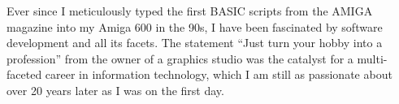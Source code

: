 \documentclass[10pt]{../developercv} %
\begin{document}

\begin{minipage}[t]{0.4\textwidth} %
	\vspace{-\baselineskip} %
	Ever since I meticulously typed the first BASIC scripts from the AMIGA magazine into my Amiga 600 in the 90s, I have been fascinated by software development and all its facets. The statement “Just turn your hobby into a profession” from the owner of a graphics studio was the catalyst for a multi-faceted career in information technology, which I am still as passionate about over 20 years later as I was on the first day.\\
\end{minipage}
\hfill %
\vspace{0.25cm} %
\begin{minipage}[t]{0.5\textwidth} %
	\vspace{-\baselineskip} %

	\begin{barchart}{5.5} %
	\end{barchart}
\end{minipage}

\begin{center}
\end{center}


\end{document}
